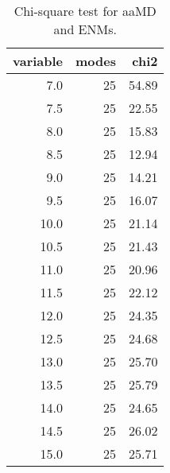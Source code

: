 \begin{table}[center]
\centering
\caption{Chi-square test for aaMD and ENMs.}
\label{tab:chi2}
\begin{tabular}{rrr}
\toprule
 variable &  modes &  chi2 \\
\midrule
      7.0 &     25 & 54.89 \\
      7.5 &     25 & 22.55 \\
      8.0 &     25 & 15.83 \\
      8.5 &     25 & 12.94 \\
      9.0 &     25 & 14.21 \\
      9.5 &     25 & 16.07 \\
     10.0 &     25 & 21.14 \\
     10.5 &     25 & 21.43 \\
     11.0 &     25 & 20.96 \\
     11.5 &     25 & 22.12 \\
     12.0 &     25 & 24.35 \\
     12.5 &     25 & 24.68 \\
     13.0 &     25 & 25.70 \\
     13.5 &     25 & 25.79 \\
     14.0 &     25 & 24.65 \\
     14.5 &     25 & 26.02 \\
     15.0 &     25 & 25.71 \\
\bottomrule
\end{tabular}
\end{table}
